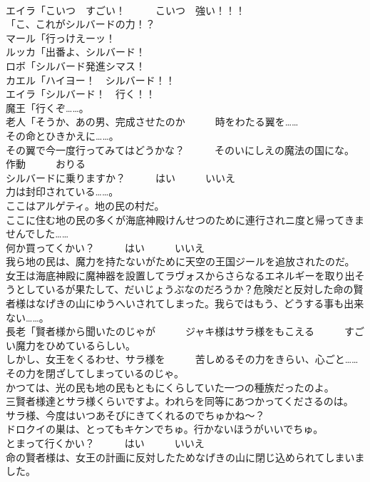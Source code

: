 \documentclass[8pt]{extreport}
\begin{document}
\begin{CJK}{UTF8}{min}
\\	エイラ「こいつ　すごい！　　　こいつ　強い！！！	
\\	「こ、これがシルバードの力！？	
\\	マール「行っけえーッ！	
\\	ルッカ「出番よ、シルバード！	
\\	ロボ「シルバード発進シマス！	
\\	カエル「ハイヨー！　シルバード！！	
\\	エイラ「シルバード！　行く！！	
\\	魔王「行くぞ……。	
\\	老人「そうか、あの男、完成させたのか　　　時をわたる翼を……	
\\	その命とひきかえに……。	
\\	その翼で今一度行ってみてはどうかな？　　　そのいにしえの魔法の国にな。	
\\	作動　　　おりる	
\\	シルバードに乗りますか？　　　はい　　　いいえ	
\\	力は封印されている……。	
\\	ここはアルゲティ。地の民の村だ。	
\\	ここに住む地の民の多くが海底神殿けんせつのために連行されニ度と帰ってきませんでした……	
\\	何か買ってくかい？　　　はい　　　いいえ	
\\	我ら地の民は、魔力を持たないがために天空の王国ジールを追放されたのだ。	
\\	女王は海底神殿に魔神器を設置してラヴォスからさらなるエネルギーを取り出そうとしているが果たして、だいじょうぶなのだろうか？危険だと反対した命の賢者様はなげきの山にゆうへいされてしまった。我らではもう、どうする事も出来ない……。	
\\	長老「賢者様から聞いたのじゃが　　　ジャキ様はサラ様をもこえる　　　すごい魔力をひめているらしい。	
\\	しかし、女王をくるわせ、サラ様を　　　苦しめるその力をきらい、心ごと……　　　その力を閉ざしてしまっているのじゃ。	
\\	かつては、光の民も地の民もともにくらしていた一つの種族だったのよ。	
\\	三賢者様達とサラ様くらいですよ。われらを同等にあつかってくださるのは。	
\\	サラ様、今度はいつあそびにきてくれるのでちゅかね～？	
\\	ドロクイの巣は、とってもキケンでちゅ。行かないほうがいいでちゅ。	
\\	とまって行くかい？　　　はい　　　いいえ	
\\	命の賢者様は、女王の計画に反対したためなげきの山に閉じ込められてしまいました。	

\end{CJK}
\end{document}
